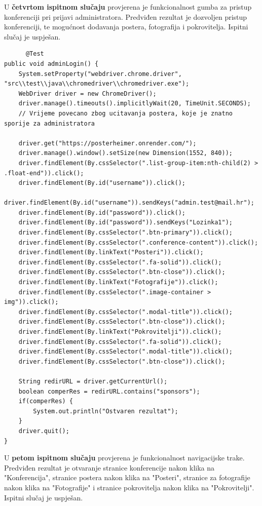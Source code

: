 			
			
			U \textbf{četvrtom ispitnom slučaju} provjerena je funkcionalnost gumba za pristup konferenciji pri prijavi administratora. Predviđen rezultat je dozvoljen pristup konferenciji, te mogućnost dodavanja postera, fotografija i pokrovitelja. Ispitni slučaj je uspješan.
			
			\begin{lstlisting}
	  @Test
public void adminLogin() {
	System.setProperty("webdriver.chrome.driver", "src\\test\\java\\chromedriver\\chromedriver.exe");
	WebDriver driver = new ChromeDriver();
	driver.manage().timeouts().implicitlyWait(20, TimeUnit.SECONDS);
	// Vrijeme povecano zbog ucitavanja postera, koje je znatno sporije za administratora
	
	driver.get("https://posterheimer.onrender.com/");
	driver.manage().window().setSize(new Dimension(1552, 840));
	driver.findElement(By.cssSelector(".list-group-item:nth-child(2) > .float-end")).click();
	driver.findElement(By.id("username")).click();
	driver.findElement(By.id("username")).sendKeys("admin.test@mail.hr");
	driver.findElement(By.id("password")).click();
	driver.findElement(By.id("password")).sendKeys("Lozinka1");
	driver.findElement(By.cssSelector(".btn-primary")).click();
	driver.findElement(By.cssSelector(".conference-content")).click();
	driver.findElement(By.linkText("Posteri")).click();
	driver.findElement(By.cssSelector(".fa-solid")).click();
	driver.findElement(By.cssSelector(".btn-close")).click();
	driver.findElement(By.linkText("Fotografije")).click();
	driver.findElement(By.cssSelector(".image-container > img")).click();
	driver.findElement(By.cssSelector(".modal-title")).click();
	driver.findElement(By.cssSelector(".btn-close")).click();
	driver.findElement(By.linkText("Pokrovitelji")).click();
	driver.findElement(By.cssSelector(".fa-solid")).click();
	driver.findElement(By.cssSelector(".modal-title")).click();
	driver.findElement(By.cssSelector(".btn-close")).click();
	
	String redirURL = driver.getCurrentUrl();
	boolean comperRes = redirURL.contains("sponsors");
	if(comperRes) {
		System.out.println("Ostvaren rezultat");
	}
	driver.quit();
}
			\end{lstlisting}
			
			
	U \textbf{petom ispitnom slučaju} provjerena je funkcionalnost navigacijske trake. Predviđen rezultat je otvaranje stranice konferencije nakon klika na "Konferencija", stranice postera nakon klika na "Posteri", stranice za fotografije nakon klika na "Fotografije" i stranice pokrovitelja nakon klika na "Pokrovitelji". Ispitni slučaj je uspješan.
	
